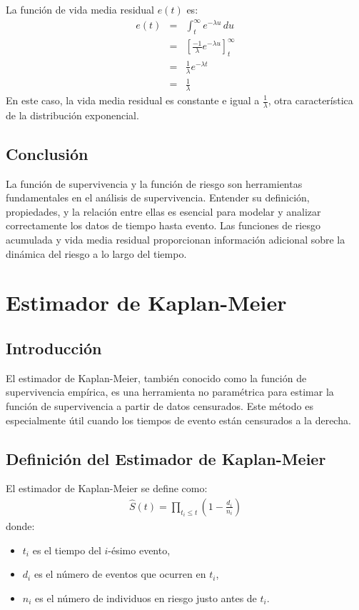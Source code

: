 \documentclass[a4paper]{report} %
\begin{document}
La funci\'on de vida media residual $e(t)$ es:
\begin{eqnarray*}
e(t) &=& \int_t^\infty e^{-\lambda u} \, du \\
     &=& \left[ \frac{-1}{\lambda} e^{-\lambda u} \right]_t^\infty \\
     &=& \frac{1}{\lambda} e^{-\lambda t} \\
     &=& \frac{1}{\lambda}
\end{eqnarray*}
En este caso, la vida media residual es constante e igual a $\frac{1}{\lambda}$, otra caracter\'istica de la distribuci\'on exponencial.

\section{Conclusi\'on}
La funci\'on de supervivencia y la funci\'on de riesgo son herramientas fundamentales en el an\'alisis de supervivencia. Entender su definici\'on, propiedades, y la relaci\'on entre ellas es esencial para modelar y analizar correctamente los datos de tiempo hasta evento. Las funciones de riesgo acumulada y vida media residual proporcionan informaci\'on adicional sobre la din\'amica del riesgo a lo largo del tiempo.



\chapter{Estimador de Kaplan-Meier}

\section{Introducci\'on}
El estimador de Kaplan-Meier, tambi\'en conocido como la funci\'on de supervivencia emp\'irica, es una herramienta no param\'etrica para estimar la funci\'on de supervivencia a partir de datos censurados. Este m\'etodo es especialmente \'util cuando los tiempos de evento están censurados a la derecha.

\section{Definici\'on del Estimador de Kaplan-Meier}
El estimador de Kaplan-Meier se define como:
\begin{eqnarray*}
\hat{S}(t) = \prod_{t_i \leq t} \left(1 - \frac{d_i}{n_i}\right)
\end{eqnarray*}
donde:
\begin{itemize}
    \item $t_i$ es el tiempo del $i$-\'esimo evento,
    \item $d_i$ es el n\'umero de eventos que ocurren en $t_i$,
    \item $n_i$ es el n\'umero de individuos en riesgo justo antes de $t_i$.
\end{itemize}
\end{document}
